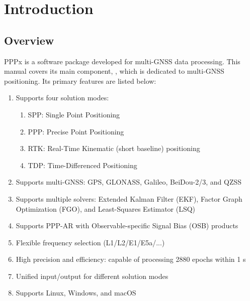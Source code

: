 \section{Introduction}






\subsection{Overview}

PPPx is a software package developed for multi-GNSS data processing.
This manual covers its main component, \pppx{}, which is dedicated to multi-GNSS positioning.
Its primary features are listed below:
\begin{enumerate}
    \item Supports four solution modes:
    \begin{enumerate}
        \item SPP: Single Point Positioning
        \item PPP: Precise Point Positioning
        \item RTK: Real-Time Kinematic (short baseline) positioning
        \item TDP: Time-Differenced Positioning
    \end{enumerate}

    \item Supports multi-GNSS: GPS, GLONASS, Galileo, BeiDou-2/3, and QZSS
    \item Supports multiple solvers: Extended Kalman Filter (EKF),
          Factor Graph Optimization (FGO), and Least-Squares Estimator (LSQ)
    \item Supports PPP-AR with Observable-specific Signal Bias (OSB) products
    \item Flexible frequency selection (L1/L2/E1/E5a/...)
    \item High precision and efficiency: capable of processing 2880 epochs within 1 s
    \item Unified input/output for different solution modes
    \item Supports Linux, Windows, and macOS
\end{enumerate}

